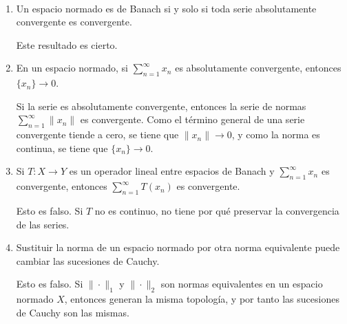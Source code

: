 \documentclass[12pt]{article}
\begin{document}
\begin{ejercicio}~
    \begin{enumerate}[label=(\alph*)]
        \item Un espacio normado es de Banach si y solo si toda serie absolutamente convergente es convergente.
        
        Este resultado es cierto.
        \item En un espacio normado, si $\sum\limits_{n=1}^{\infty} x_n$ es absolutamente convergente, entonces $\{x_n\}\to 0$.
        
        Si la serie es absolutamente convergente, entonces la serie de normas $\sum\limits_{n=1}^{\infty} \|x_n\|$ es convergente. Como el término general de una serie convergente tiende a cero, se tiene que $\|x_n\| \to 0$, y como la norma es continua, se tiene que $\{x_n\} \to 0$.
        \item Si $T: X \to Y$ es un operador lineal entre espacios de Banach y $\sum\limits_{n=1}^{\infty} x_n$ es convergente, entonces $\sum\limits_{n=1}^{\infty} T(x_n)$ es convergente.
        
        Esto es falso. Si $T$ no es continuo, no tiene por qué preservar la convergencia de las series.

        \item Sustituir la norma de un espacio normado por otra norma equivalente puede cambiar las sucesiones de Cauchy.
        
        Esto es falso. Si $\|\cdot\|_1$ y $\|\cdot\|_2$ son normas equivalentes en un espacio normado $X$, entonces generan la misma topología, y por tanto las sucesiones de Cauchy son las mismas.
    \end{enumerate}    
\end{ejercicio}
\end{document}
